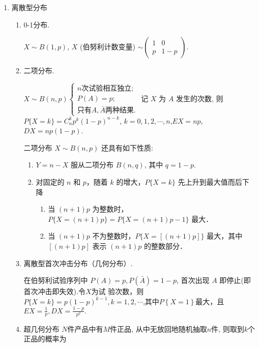 \begin{enumerate}
    \item 离散型分布
          \begin{enumerate}
              \item 0-1分布.

                    $X \sim B(1,p)$, $X$ (伯努利计数变量) $\sim \begin{pmatrix} 1 & 0 \\ p & 1-p \end{pmatrix}$.
              \item 二项分布.

                    $X \sim B(n,p) \begin{cases} n\text{次试验相互独立;} \\ P(A) = p; \\ \text{只有}A, \overline{A}\text{两种结果}. \end{cases}$
                    记 $X$ 为 $A$ 发生的次数, 则$P\{X = k\} = C_n^k p^k (1-p)^{n-k}$, $k = 0, 1, 2, \cdots, n$,$EX = np$, $DX = np(1-p)$.

                    二项分布 $X \sim B(n,p)$ 还具有如下性质:
                    \begin{enumerate}
                        \item $Y = n - X$ 服从二项分布 $B(n,q)$, 其中 $q = 1 - p$.
                        \item 对固定的 $n$ 和 $p$，随着 $k$ 的增大，$P\{X=k\}$ 先上升到最大值而后下降
                              \begin{enumerate}
                                  \item 当 $(n+1)p$ 为整数时，$P\{X=(n+1)p\} = P\{X=(n+1)p-1\}$ 最大．
                                  \item 当 $(n+1)p$ 不为整数时，$P\{X=\left[(n+1)p\right]\}$ 最大，其中 $\left[(n+1)p\right]$ 表示 $(n+1)p$ 的整数部分．
                              \end{enumerate}
                    \end{enumerate}
              \item 离散型首次冲击分布（几何分布）.

                    在伯努利试验序列中 $P(A)=p,P(\bar{A})=1-p$, 首次出现 $A$ 即停止(即首次冲击即失效).令$X$为试
                    验次数，则$P\{X=k\}=p(1-p)^{k-1},k=1,2,\cdots$,其中$P\left\{X=1\right\}$最大，且$EX=\frac1p,DX=\frac{1-p}{p^{2}}.$
              \item 超几何分布
                    $N$件产品中有$M$件正品, 从中无放回地随机抽取$n$件, 则取到$k$个正品的概率为


\end{enumerate}
\end{enumerate}
